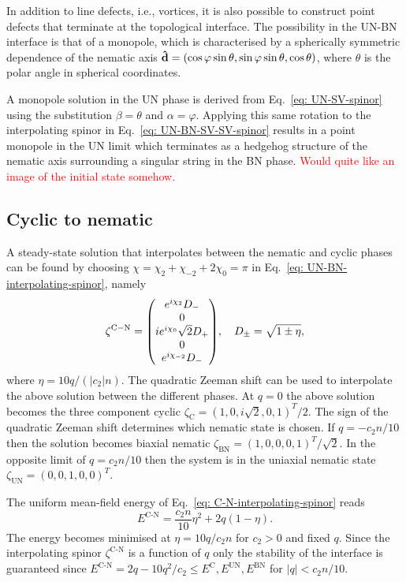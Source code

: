 In addition to line defects, i.e., vortices, it is also possible to construct
point defects that terminate at the topological interface.
The possibility in the UN-BN interface is that of a monopole, which is
characterised by a spherically symmetric dependence of the nematic axis
\(\vb{\hat{d}} = (\cos\varphi \sin\theta, \sin\varphi \sin\theta, \cos\theta)\),
where \(\theta \) is the polar angle in spherical coordinates.

A monopole solution in the UN phase is derived from Eq.~\eqref{eq: UN-SV-spinor}
using the substitution \(\beta = \theta \) and \(\alpha=\varphi \).
Applying this same rotation to the interpolating spinor in
Eq.~\eqref{eq: UN-BN-SV-SV-spinor} results in a point monopole in the UN limit
which terminates as a hedgehog structure of the nematic axis surrounding a
singular string in the BN phase.
\textcolor{red}{Would quite like an image of the initial state somehow.}

\subsection{Cyclic to nematic}
A steady-state solution that interpolates between the nematic and cyclic phases
can be found by choosing \(\chi = \chi_2 + \chi_{-2} + 2\chi_0 = \pi \) in
Eq.~\eqref{eq: UN-BN-interpolating-spinor}, namely
\begin{equation}\label{eq: C-N-interpolating-spinor}
    \zeta^\mathrm{C-N} = \mqty(
    e^{i\chi_2}D_- \\
    0 \\
    ie^{i\chi_0}\sqrt{2}D_+ \\
    0 \\
    e^{i\chi_{-2}}D_-),
    \quad D_\pm = \sqrt{1\pm\eta},
\end{equation}
where \(\eta = 10q/(|c_2|n)\).
The quadratic Zeeman shift can be used to interpolate the above solution between
the different phases.
At \(q = 0\) the above solution becomes the three component cyclic
\(\zeta_\mathrm{C} = {(1, 0, i\sqrt{2}, 0, 1)}^T/2\).
The sign of the quadratic Zeeman shift determines which nematic state is chosen.
If \(q = -c_2n/10\) then the solution becomes biaxial nematic
\(\zeta_\mathrm{BN} = {(1, 0, 0, 0, 1)}^T/\sqrt{2}\).
In the opposite limit of \(q = c_2n/10\) then the system is in the uniaxial
nematic state \(\zeta_\mathrm{UN} = {(0, 0, 1, 0, 0)}^T\).

The uniform mean-field energy of Eq.~\eqref{eq: C-N-interpolating-spinor} reads
\begin{equation}
    E^\text{C-N} = \frac{c_2n}{10}\eta^2 + 2q(1 - \eta).
\end{equation}
The energy becomes minimised at \(\eta = 10q/c_2n\) for \(c_2 > 0\) and fixed
\(q\).
Since the interpolating spinor \(\zeta^\text{C-N}\) is a function of \(q\) only
the stability of the interface is guaranteed since \(E^\text{C-N} =
2q-10q^2/c_2 \leq E^\text{C}, E^\text{UN},
E^\text{BN}\) for \(|q| < c_2n/10\).

